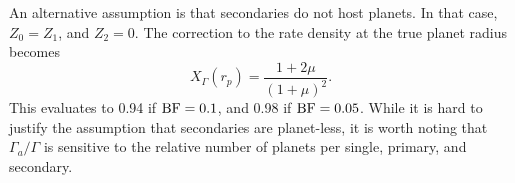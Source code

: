 An alternative assumption is that secondaries do not host planets. In that 
case, $Z_0=Z_1$, and $Z_2=0$. The correction to the rate density at the true 
planet radius becomes
\begin{equation}
X_\Gamma(r_p) = \frac{1+2\mu}{(1+\mu)^2}.
\end{equation}
This evaluates to 0.94 if ${\rm BF}=0.1$, and 0.98 if ${\rm BF}=0.05$.
While it is hard to justify the assumption that secondaries are planet-less, 
it is worth noting that $\Gamma_a/\Gamma$ is sensitive to the relative number 
of planets per single, primary, and secondary.